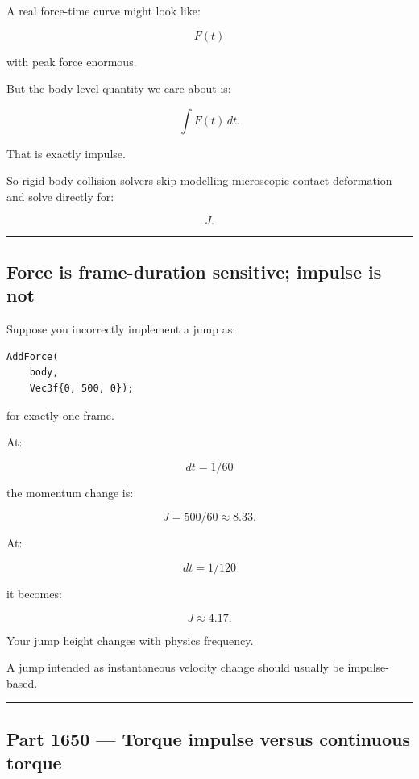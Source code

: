 A real force-time curve might look like:

\[
F(t)
\]

with peak force enormous.

But the body-level quantity we care about is:

\[
\int F(t)\,dt.
\]

That is exactly impulse.

So rigid-body collision solvers skip modelling microscopic contact deformation and solve directly for:

\[
J.
\]

\begin{center}\rule{0.5\linewidth}{0.5pt}\end{center}

\subsection{Force is frame-duration sensitive; impulse is not}\label{06-engine-ii-ch036-force-is-frame-duration-sensitive-impulse-is-not}

Suppose you incorrectly implement a jump as:

\begin{verbatim}
AddForce(
    body,
    Vec3f{0, 500, 0});
\end{verbatim}

for exactly one frame.

At:

\[
dt=1/60
\]

the momentum change is:

\[
J=500/60\approx8.33.
\]

At:

\[
dt=1/120
\]

it becomes:

\[
J\approx4.17.
\]

Your jump height changes with physics frequency.

A jump intended as instantaneous velocity change should usually be impulse-based.

\begin{center}\rule{0.5\linewidth}{0.5pt}\end{center}

\subsection{Part 1650 --- Torque impulse versus continuous torque}\label{06-engine-ii-ch036-part-1650-torque-impulse-versus-continuous-torque}

